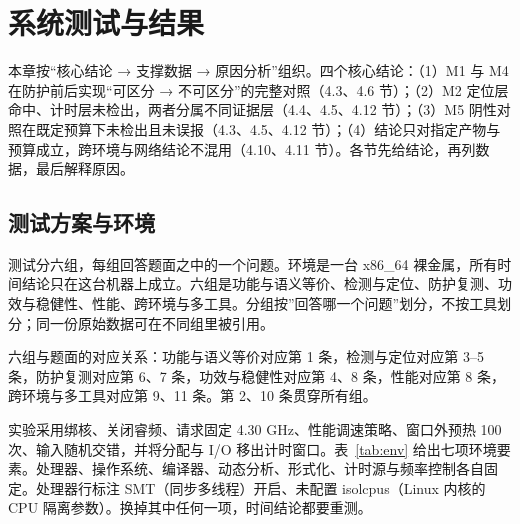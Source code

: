 
\section{系统测试与结果}

本章按“核心结论 → 支撑数据 → 原因分析”组织。四个核心结论：（1）M1 与 M4 在防护前后实现“可区分 → 不可区分”的完整对照（4.3、4.6 节）；（2）M2 定位层命中、计时层未检出，两者分属不同证据层（4.4、4.5、4.12 节）；（3）M5 阴性对照在既定预算下未检出且未误报（4.3、4.5、4.12 节）；（4）结论只对指定产物与预算成立，跨环境与网络结论不混用（4.10、4.11 节）。各节先给结论，再列数据，最后解释原因。

\subsection{测试方案与环境}

测试分六组，每组回答题面之中的一个问题。环境是一台 x86\_64 裸金属，所有时间结论只在这台机器上成立。六组是功能与语义等价、检测与定位、防护复测、功效与稳健性、性能、跨环境与多工具。分组按”回答哪一个问题”划分，不按工具划分；同一份原始数据可在不同组里被引用。

六组与题面的对应关系：功能与语义等价对应第 1 条，检测与定位对应第 3--5 条，防护复测对应第 6、7 条，功效与稳健性对应第 4、8 条，性能对应第 8 条，跨环境与多工具对应第 9、11 条。第 2、10 条贯穿所有组。

实验采用绑核、关闭睿频、请求固定 4.30 GHz、性能调速策略、窗口外预热 100 次、输入随机交错，并将分配与 I/O 移出计时窗口。表~\ref{tab:env} 给出七项环境要素。处理器、操作系统、编译器、动态分析、形式化、计时源与频率控制各自固定。处理器行标注 SMT（同步多线程）开启、未配置 isolcpus（Linux 内核的 CPU 隔离参数）。换掉其中任何一项，时间结论都要重测。%

